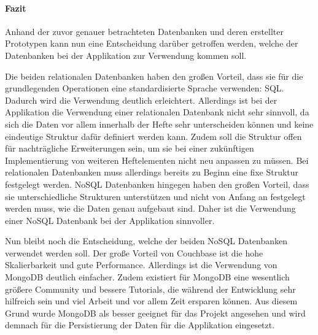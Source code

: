 \paragraph{Fazit}
Anhand der zuvor genauer betrachteten Datenbanken und deren erstellter Prototypen kann nun eine Entscheidung darüber getroffen werden, welche der Datenbanken bei der Applikation zur Verwendung kommen soll.

Die beiden relationalen Datenbanken haben den großen Vorteil, dass sie für die grundlegenden Operationen eine standardisierte Sprache verwenden: SQL. Dadurch wird die Verwendung deutlich erleichtert. Allerdings ist bei der Applikation die Verwendung einer relationalen Datenbank nicht sehr sinnvoll, da sich die Daten vor allem innerhalb der Hefte sehr unterscheiden können und keine eindeutige Struktur dafür definiert werden kann. Zudem soll die Struktur offen für nachträgliche Erweiterungen sein, um sie bei einer zukünftigen Implementierung von weiteren Heftelementen nicht neu anpassen zu müssen. Bei relationalen Datenbanken muss allerdings bereits zu Beginn eine fixe Struktur festgelegt werden. NoSQL Datenbanken hingegen haben den großen Vorteil, dass sie unterschiedliche Strukturen unterstützen und nicht von Anfang an festgelegt werden muss, wie die Daten genau aufgebaut sind. Daher ist die Verwendung einer NoSQL Datenbank bei der Applikation sinnvoller.

Nun bleibt noch die Entscheidung, welche der beiden NoSQL Datenbanken verwendet werden soll. Der große Vorteil von Couchbase ist die hohe Skalierbarkeit und gute Performance. Allerdings ist die Verwendung von MongoDB deutlich einfacher. Zudem existiert für MongoDB eine wesentlich größere Community und bessere Tutorials, die während der Entwicklung sehr hilfreich sein und viel Arbeit und vor allem Zeit ersparen können. Aus diesem Grund wurde MongoDB als besser geeignet für das Projekt angesehen und wird demnach für die Persistierung der Daten für die Applikation eingesetzt.